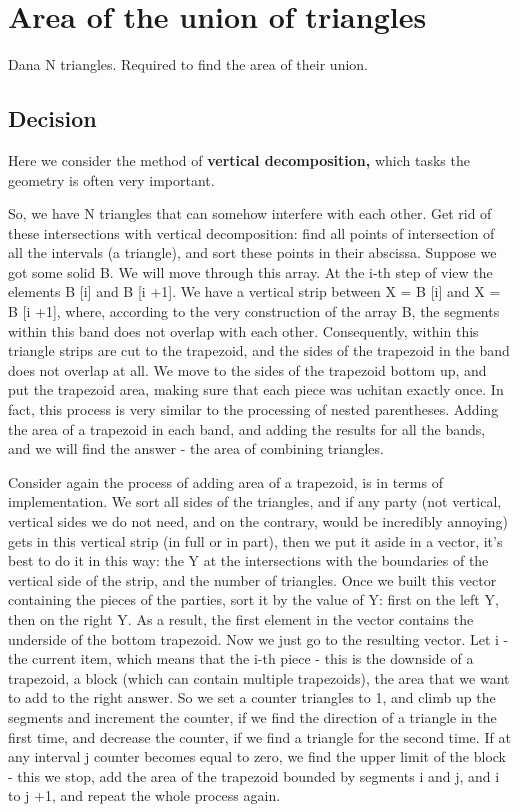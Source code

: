 \section{ Area of the union of triangles }
Dana N triangles. Required to find the area of ​​their union.

\subsection{ Decision }
Here we consider the method of \textbf{vertical decomposition,} which tasks the geometry is often very important.

So, we have N triangles that can somehow interfere with each other. Get rid of these intersections with vertical decomposition: find all points of intersection of all the intervals (a triangle), and sort these points in their abscissa. Suppose we got some solid B. We will move through this array. At the i-th step of view the elements B [i] and B [i +1]. We have a vertical strip between X = B [i] and X = B [i +1], where, according to the very construction of the array B, the segments within this band does not overlap with each other. Consequently, within this triangle strips are cut to the trapezoid, and the sides of the trapezoid in the band does not overlap at all. We move to the sides of the trapezoid bottom up, and put the trapezoid area, making sure that each piece was uchitan exactly once. In fact, this process is very similar to the processing of nested parentheses. Adding the area of ​​a trapezoid in each band, and adding the results for all the bands, and we will find the answer - the area of ​​combining triangles.

Consider again the process of adding area of ​​a trapezoid, is in terms of implementation. We sort all sides of the triangles, and if any party (not vertical, vertical sides we do not need, and on the contrary, would be incredibly annoying) gets in this vertical strip (in full or in part), then we put it aside in a vector, it's best to do it in this way: the Y at the intersections with the boundaries of the vertical side of the strip, and the number of triangles. Once we built this vector containing the pieces of the parties, sort it by the value of Y: first on the left Y, then on the right Y. As a result, the first element in the vector contains the underside of the bottom trapezoid. Now we just go to the resulting vector. Let i - the current item, which means that the i-th piece - this is the downside of a trapezoid, a block (which can contain multiple trapezoids), the area that we want to add to the right answer. So we set a counter triangles to 1, and climb up the segments and increment the counter, if we find the direction of a triangle in the first time, and decrease the counter, if we find a triangle for the second time. If at any interval j counter becomes equal to zero, we find the upper limit of the block - this we stop, add the area of ​​the trapezoid bounded by segments i and j, and i to j +1, and repeat the whole process again.

